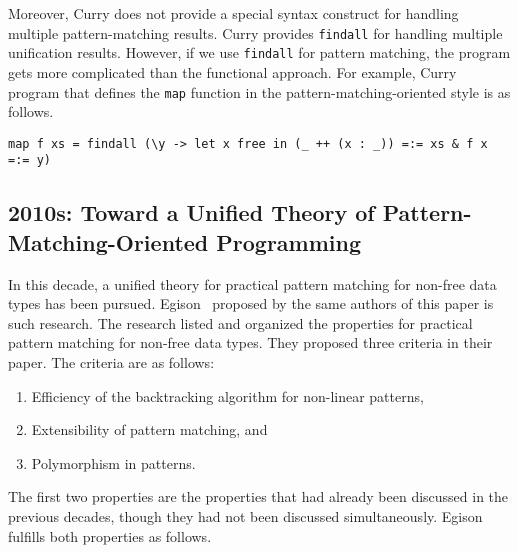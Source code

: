 \documentclass{article}
\begin{document}
\noindent Moreover, Curry does not provide a special syntax construct for handling multiple pattern-matching results.
Curry provides \texttt{findall} for handling multiple unification results.
However, if we use \texttt{findall} for pattern matching, the program gets more complicated than the functional approach.
For example, Curry program that defines the \texttt{map} function in the pattern-matching-oriented style is as follows.

\begin{lstlisting}[language=egison]
map f xs = findall (\y -> let x free in (_ ++ (x : _)) =:= xs & f x =:= y)
\end{lstlisting}


\subsection{2010s: Toward a Unified Theory of Pattern-Matching-Oriented Programming}

In this decade, a unified theory for practical pattern matching for non-free data types has been pursued.
Egison~\cite{egi2018Aplas} proposed by the same authors of this paper is such research.
The research listed and organized the properties for practical pattern matching for non-free data types.
They proposed three criteria in their paper.
The criteria are as follows:

\begin{enumerate}
\item Efficiency of the backtracking algorithm for non-linear patterns,
\item Extensibility of pattern matching, and
\item Polymorphism in patterns.
\end{enumerate}

\medskip

The first two properties are the properties that had already been discussed in the previous decades, though they had not been discussed simultaneously.
Egison fulfills both properties as follows.
\end{document}
